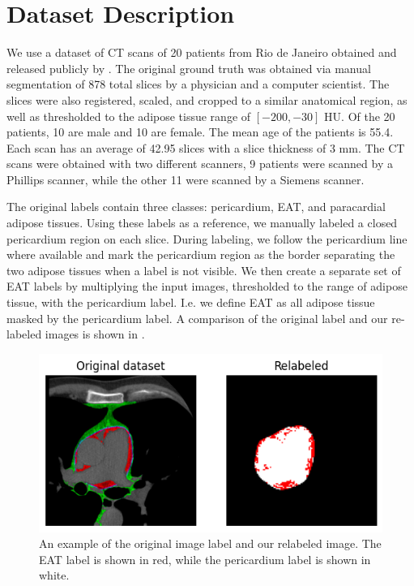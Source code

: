 \section{Dataset Description}\label{data}

We use a dataset of CT scans of 20 patients from Rio de Janeiro obtained and released publicly by \citet{Rodrigues2016}. The original ground truth was obtained via manual segmentation of 878 total slices by a physician and a computer scientist. The slices were also registered, scaled, and cropped to a similar anatomical region, as well as thresholded to the adipose tissue range of $[-200, -30]$ HU. Of the 20 patients, 10 are male and 10 are female. The mean age of the patients is 55.4. Each scan has an average of 42.95 slices with a slice thickness of 3 mm. The CT scans were obtained with two different scanners, 9 patients were scanned by a Phillips scanner, while the other 11 were scanned by a Siemens scanner.

The original labels contain three classes: pericardium, EAT, and paracardial adipose tissues. Using these labels as a reference, we manually labeled a closed pericardium region on each slice. During labeling, we follow the pericardium line where available and mark the pericardium region as the border separating the two adipose tissues when a label is not visible. We then create a separate set of EAT labels by multiplying the input images, thresholded to the range of adipose tissue, with the pericardium label. I.e. we define EAT as all adipose tissue masked by the pericardium label. A comparison of the original label and our re-labeled images is shown in .

\begin{figure}[h]
    \centering
    \includegraphics[width=0.65\columnwidth]{images/6/relabel}
    \caption{An example of the original image label and our relabeled image. The EAT label is shown in red, while the pericardium label is shown in white. \cite{bencevicEpicardialAdiposeTissue2021}}
    \label{fig:dataset-relabel}
\end{figure}

